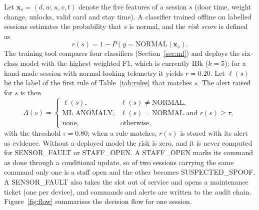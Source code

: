 Let $\mathbf{x}_s = (d, w, u, v, t)$ denote the five features of a session $s$ (door time, weight change, unlocks,
valid card and stay time). A classifier trained offline on labelled sessions estimates the probability that $s$ is
normal, and the \emph{risk score} is defined as
\begin{equation}
r(s) = 1 - P\left(y = \text{NORMAL} \mid \mathbf{x}_s\right).
\label{eq:risk}
\end{equation}
The training tool compares four classifiers (Section~\ref{sec:ml}) and deploys the six-class model with the highest weighted F1,
which is currently IBk ($k=5$); for a hand-made session with normal-looking telemetry it yields $r = 0.20$. Let
$\ell(s)$ be the label of the first rule of Table~\ref{tab:rules} that matches $s$. The alert raised for $s$ is then
\begin{equation}
A(s) =
\begin{cases}
\ell(s), & \ell(s) \neq \text{NORMAL},\\
\text{ML\_ANOMALY}, & \ell(s) = \text{NORMAL} \text{ and } r(s) \geq \tau,\\
\text{none}, & \text{otherwise},
\end{cases}
\label{eq:alert}
\end{equation}
with the threshold $\tau = 0.80$; when a rule matches, $r(s)$ is stored with its alert as evidence. Without a
deployed model the risk is zero, and it is never computed for SENSOR\_FAULT or STAFF\_OPEN. A STAFF\_OPEN marks its
command as done through a conditional update, so of two sessions carrying the same command only one is a staff open and
the other becomes SUSPECTED\_SPOOF. A SENSOR\_FAULT also takes the slot out of service and opens a maintenance ticket
(one per device), and commands and alerts are written to the audit chain. Figure~\ref{fig:flow} summarises the decision
flow for one session.

